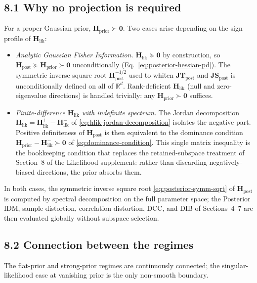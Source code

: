 \documentclass[11pt]{article}
\begin{document}
\subsection*{8.1 Why no projection is required}

For a proper Gaussian prior, $\mathbf H_{\mathrm{prior}} \succ \mathbf 0$. Two cases arise depending on the sign profile of $\mathbf H_{\mathrm{lik}}$:
\begin{itemize}
\item \emph{Analytic Gaussian Fisher Information.} $\mathbf H_{\mathrm{lik}} \succeq \mathbf 0$ by construction, so $\mathbf H_{\mathrm{post}} \succeq \mathbf H_{\mathrm{prior}} \succ \mathbf 0$ unconditionally (Eq.~\eqref{eq:posterior-hessian-pd}). The symmetric inverse square root $\mathbf H_{\mathrm{post}}^{-1/2}$ used to whiten $\mathbf{JT}_{\mathrm{post}}$ and $\mathbf{JS}_{\mathrm{post}}$ is unconditionally defined on all of $\mathbb{R}^d$. Rank-deficient $\mathbf H_{\mathrm{lik}}$ (null and zero-eigenvalue directions) is handled trivially: any $\mathbf H_{\mathrm{prior}} \succ \mathbf 0$ suffices.
\item \emph{Finite-difference $\mathbf H_{\mathrm{lik}}$ with indefinite spectrum.} The Jordan decomposition $\mathbf H_{\mathrm{lik}} = \mathbf H_{\mathrm{lik}}^+ - \mathbf H_{\mathrm{lik}}^-$ of \eqref{eq:hlik-jordan-decomposition} isolates the negative part. Positive definiteness of $\mathbf H_{\mathrm{post}}$ is then equivalent to the dominance condition $\mathbf H_{\mathrm{prior}} - \mathbf H_{\mathrm{lik}}^- \succ \mathbf 0$ of \eqref{eq:dominance-condition}. This single matrix inequality is the bookkeeping condition that replaces the retained-subspace treatment of Section~8 of the Likelihood supplement: rather than discarding negatively-biased directions, the prior absorbs them.
\end{itemize}
In both cases, the symmetric inverse square root \eqref{eq:posterior-symm-sqrt} of $\mathbf H_{\mathrm{post}}$ is computed by spectral decomposition on the full parameter space; the Posterior IDM, sample distortion, correlation distortion, DCC, and DIB of Sections~4--7 are then evaluated globally without subspace selection.

\subsection*{8.2 Connection between the regimes}

The flat-prior and strong-prior regimes are continuously connected; the singular-likelihood case at vanishing prior is the only non-smooth boundary.
\end{document}
